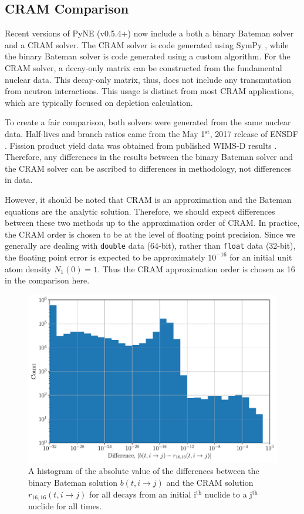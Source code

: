 \documentclass[letterpaper]{physor2018}
\newcommand{\ith}{i$^{\mathrm{th}}$\xspace}
\newcommand{\jth}{j$^{\mathrm{th}}$\xspace}
\begin{document}
\subsection{CRAM Comparison}
\label{subsec-cram}
Recent versions of PyNE (v0.5.4+)
now include a both a binary Bateman solver and a CRAM solver.
The CRAM solver is code generated using SymPy \cite{10.7717/peerj-cs.103},
while the binary Bateman solver is code generated using a custom algorithm.
For the CRAM solver, a decay-only matrix can be constructed from the
fundamental nuclear data. This decay-only matrix, thus, does not include
any transmutation from neutron interactions. This usage is distinct from
most CRAM applications, which are typically focused on depletion calculation.

To create a fair comparison, both solvers were generated from the same
nuclear data. Half-lives and branch
ratios came from the May 1$^{\mathrm{st}}$, 2017 release of ENSDF
\cite{Bhat1992,ensdfmaintained}. Fission product yield data was obtained
from published WIMS-D results \cite{aldama2003wims}. Therefore, any differences
in the results between the binary Bateman solver and the CRAM
solver can be ascribed to differences in methodology, not differences in data.

However, it should be noted that CRAM is an approximation and the Bateman
equations are the analytic solution. Therefore, we should expect differences
between these two methods up to the approximation order of CRAM. In practice,
the CRAM order is chosen to be at the level of floating point precision.
Since we generally are dealing with \texttt{double} data (64-bit), rather than
\texttt{float} data (32-bit), the floating point error is expected to be
approximately $10^{-16}$ for an initial unit atom density $N_1(0) = 1$.
Thus the CRAM approximation order is chosen as 16 in the comparison here.

\begin{figure}[!htb]
  \centering
  \includegraphics[scale=0.80]{./diff-hist.pdf}
  \caption{A histogram of the absolute value of the differences between the
           binary Bateman solution $b(t, i\to j)$
           and the CRAM solution  $r_{16,16}(t, i\to j)$ for all decays
           from an initial \ith nuclide to a \jth nuclide for all times.}
  \label{fig-diff-hist}
\end{figure}
\end{document}
